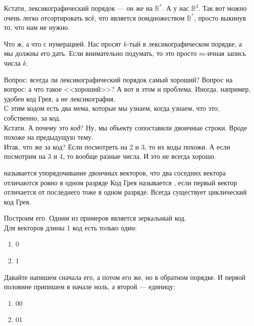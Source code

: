\documentclass{article}
\begin{document}
\begin{itemize}
\begin{Comment}
            Кстати, лексикографический порядок --- он же на $\mathbb B^*$. А у нас $\mathbb B^3$. Так вот можно очень легко отсортировать всё, что является помдножеством $\mathbb B^*$, просто выкинув то, что нам не нужно.
        \end{Comment}
        \begin{Comment}
            Что ж, а что с нумерацией. Нас просят $k$-тый в лексикографическом порядке, а мы должны его дать. Если внимательно подумать, то это просто $m$-ичная запись числа $k$.
        \end{Comment}
        \begin{Comment}
            Вопрос: всегда ли лексикографический порядок самый хороший? Вопрос на вопрос: а что такое <<хороший>>? А вот в этом и проблема. Иногда, например, удобен код Грея, а не лексикография.\\
            С этим кодом есть два мема, которые мы узнаем, когда узнаем, что это, собственно, за код.\\
            Кстати. А почему это \textit{код}? Ну, мы объекту сопоставили двоичные строки. Вроде похоже на предыдущую тему.\\
            Итак, что же за код? Если посмотреть на 2 и 3, то их коды похожи. А если посмотрим на 3 и 4, то вообще разные числа. И это не всегда хорошо. 
        \end{Comment}
        \dfn {} называется упорядочивание двоичных векторов, что два соседних вектора отличаются ровно в одном разряде
        \dfn Код Грея называется , если первый вектор отличается от последнего тоже в одном разряде.
        \thm Всегда существует циклический код Грея.
        \begin{Proof}
            Построим его. Одним из примеров является зеркальный код.\\
            Для векторов длины 1 код есть только один:
            \begin{enumerate}
                \addtocounter{enumi}{-1}
                \item 0
                \item 1
            \end{enumerate}
            Давайте напишем сначала его, а потом его же, но в обратном порядке. И первой половине припишем в начале ноль, а второй --- единицу:
            \begin{enumerate}
                \addtocounter{enumi}{-1}
                \item 00
                \item 01

\end{enumerate}
\end{Proof}
\end{itemize}
\end{document}
